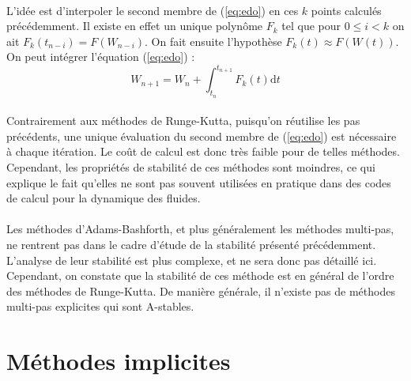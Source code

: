     \paragraph{}
    L'idée est d'interpoler le second membre de (\ref{eq:edo}) en ces $k$ points calculés précédemment.
    Il existe en effet un unique polynôme $F_k$ tel que pour $0 \leq i < k$ on ait $F_k\left(t_{n-i}\right) = F\left(W_{n-i}\right)$.
    On fait ensuite l'hypothèse $F_k\left(t\right) \approx F\left(W\left(t\right)\right)$.
    On peut intégrer l'équation (\ref{eq:edo}) :
    \[W_{n+1} = W_n + \int_{t_n}^{t_{n+1}}F_k\left(t\right)\mathrm{d}t\]

    \paragraph{}
    Contrairement aux méthodes de Runge-Kutta, puisqu'on réutilise les pas précédents, une unique évaluation du second membre de (\ref{eq:edo}) est nécessaire à chaque itération.
    Le coût de calcul est donc très faible pour de telles méthodes.
    Cependant, les propriétés de stabilité de ces méthodes sont moindres, ce qui explique le fait qu'elles ne sont pas souvent utilisées en pratique dans des codes de calcul pour la dynamique des fluides.

    \paragraph{}
    Les méthodes d'Adams-Bashforth, et plus généralement les méthodes multi-pas, ne rentrent pas dans le cadre d'étude de la stabilité présenté précédemment.
    L'analyse de leur stabilité est plus complexe, \cite{HairerWanner1996}  et ne sera donc pas détaillé ici.
    Cependant, on constate que la stabilité de ces méthode est en général de l'ordre des méthodes de Runge-Kutta.
    De manière générale, il n'existe pas de méthodes multi-pas explicites qui sont A-stables.


\section{Méthodes implicites}
